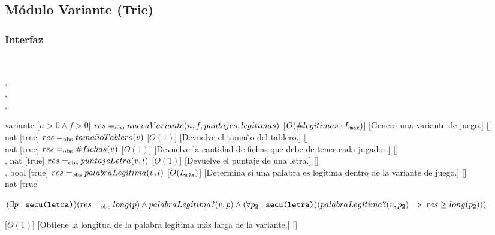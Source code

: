 \subsection{Módulo Variante (Trie)}
\begin{interfaz}{\subsubsection{Interfaz}}
  \\
  \usa{\falta}
  \par\noindent
  \begin{operaciones}
    {
      \begin{adjustwidth}{2em}{}
      ,\\
      ,\\
      ,\\
      \end{adjustwidth}
    }{variante}
    [$n>0\land f>0$]
    {$res\igobs nuevaVariante(n,f,puntajes,leg\acute{\imath}timas)$}
    [$O(\#leg\acute{\imath}timas\cdot\Lmax)$]
    [Genera una variante de juego.]
    [\falta]\\

    \noindent{}
    {}{nat}
    [true]
    {$res\igobs tama\tilde{n}oTablero(v)$}
    [$O(1)$]
    [Devuelve el tamaño del tablero.]
    [\falta]\\

    \noindent{}
    {}{nat}
    [true]
    {$res\igobs \#fichas(v)$}
    [$O(1)$]
    [Devuelve la cantidad de fichas que debe de tener cada jugador.]
    [\falta]\\

    \noindent{}
    {, }{nat}
    [true]
    {$res\igobs puntajeLetra(v,l)$}
    [$O(1)$]
    [Devuelve el puntaje de una letra.]
    [\falta]\\

    \noindent{}
    {, }{bool}
    [true]
    {$res\igobs palabraLeg\acute{\imath}tima(v,l)$}
    [$O(\Lmax)$]
    [Determina si una palabra es legítima dentro de la variante de juego.]
    [\falta]\\

    \noindent{}
    {}{nat}
    [true]
    {
      \begin{adjustwidth}{2em}{}

      $(\exists p:\texttt{secu(letra)})(res\igobs long(p)\land palabraLeg\acute{\imath}tima?(v,p)\land\\(\forall p_{2}:\texttt{secu(letra)})( palabraLeg\acute{\imath}tima?(v,p_{2})\implies res\geq long(p_{2})))$
      \end{adjustwidth}
    }
    [$O(1)$]
    [Obtiene la longitud de la palabra legítima más larga de la variante.]
    [\falta]
  \end{operaciones}
\end{interfaz}
